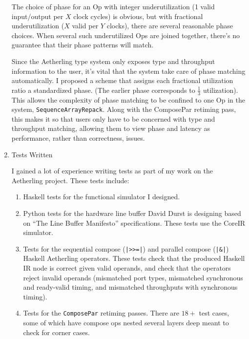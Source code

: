 \documentclass[11pt]{article}
\begin{document}
\begin{enumerate}
The choice of phase for an Op with integer underutilization (1 valid
input/output per $X$ clock cycles) is obvious, but with fractional
underutilization ($X$ valid per $Y$ clocks), there are several
reasonable phase choices. When several such underutilized Ops
are joined together, there's no guarantee that their phase patterns
will match.

Since the Aetherling type system only exposes type and throughput
information to the user, it's vital that the system take care of phase
matching automatically. I proposed a scheme that assigns each
fractional utilization ratio a standardized phase. (The earlier phase
corresponds to $\frac{1}{3}$ utilization). This allows the complexity
of phase matching to be confined to one Op in the system,
\texttt{SequenceArrayRepack}. Along with the ComposePar retiming pass,
this makes it so that users only have to be concerned with type and
throughput matching, allowing them to view phase and latency as
performance, rather than correctness, issues.

\item Tests Written

I gained a lot of experience writing tests as part of my work
on the Aetherling project. These tests include:

\begin{enumerate}

\item Haskell tests for the functional simulator I designed.

\item Python tests for the hardware line buffer David Durst is
  designing based on ``The Line Buffer Manifesto''
  specifications. These tests use the CoreIR simulator.

\item Tests for the sequential compose (\texttt{|>>=|}) and parallel
  compose (\texttt{|\&|}) Haskell Aetherling operators. These tests
  check that the produced Haskell IR node is correct given valid
  operands, and check that the operators reject invalid operands
  (mismatched port types, mismatched synchronous and ready-valid
  timing, and mismatched throughputs with synchronous timing).

\item Tests for the \texttt{ComposePar} retiming passes. There are
  $18+$ test cases, some of which have compose ops nested several
  layers deep meant to check for corner cases.
\end{enumerate}
\end{enumerate}

\end{document}
